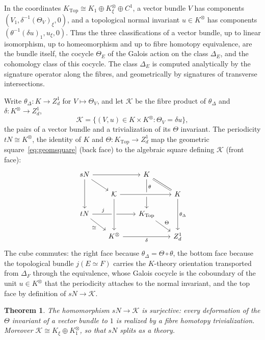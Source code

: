 \documentclass[11pt]{amsart}
\theoremstyle{plain}
\newtheorem{theorem}{Theorem}[section]
\theoremstyle{definition}
\numberwithin{equation}{section}
\newcommand{\Ktop}{K_{\mathrm{Top}}}
\begin{document}
In the coordinates $\Ktop\cong K_1\oplus K^\otimes_\xi\oplus C^1$, a vector bundle $V$ has components $(V_1,\delta^{-1}(\Theta_V)_\xi,0)$, and a topological normal invariant $u\in K^\otimes$ has components $(\theta^{-1}(\delta u)_1,u_\xi,0)$.
Thus the three classifications of a vector bundle, up to linear isomorphism, up to homeomorphism and up to fibre homotopy equivalence, are the bundle itself, the cocycle $\Theta_E$ of the Galois action on the class $\Delta_E$, and the cohomology class of this cocycle.
The class $\Delta_E$ is computed analytically by the signature operator along the fibres, and geometrically by signatures of transverse intersections.

Write $\theta_\Delta\colon K\to Z^1_d$ for $V\mapsto\Theta_V$, and let $\mathcal K$ be the fibre product of $\theta_\Delta$ and $\delta\colon K^\otimes\to Z^1_d$,
\[
\mathcal K=\{(V,u)\in K\times K^\otimes:\Theta_V=\delta u\},
\]
the pairs of a vector bundle and a trivialization of its $\Theta$ invariant.
The periodicity $tN\cong K^\otimes$, the identity of $K$ and $\Theta\colon\Ktop\to Z^1_d$ map the geometric square~\eqref{eq:geomsquare} (back face) to the algebraic square defining $\mathcal K$ (front face):
\begin{equation}\label{eq:cube}
\begin{tikzcd}[row sep=scriptsize,column sep=scriptsize]
sN\arrow[rr]\arrow[dd]\arrow[rd] & & K\arrow[dd,"\theta" near start]\arrow[rd,equal] & \\
& \mathcal K\arrow[rr,crossing over] & & K\arrow[dd,"\theta_\Delta"]\\
tN\arrow[rr,"j" near start]\arrow[rd,"\cong"'] & & \Ktop\arrow[rd,"\Theta"] & \\
& K^\otimes\arrow[rr,"\delta"']\arrow[from=uu,crossing over] & & Z^1_d
\end{tikzcd}
\end{equation}
The cube commutes: the right face because $\theta_\Delta=\Theta\circ\theta$, the bottom face because the topological bundle $j(E\simeq F)$ carries the $K$-theory orientation transported from $\Delta_F$ through the equivalence, whose Galois cocycle is the coboundary of the unit $u\in K^\otimes$ that the periodicity attaches to the normal invariant, and the top face by definition of $sN\to\mathcal K$.

\begin{theorem}\label{thm:sN}
The homomorphism $sN\to\mathcal K$ is surjective: every deformation of the $\Theta$ invariant of a vector bundle to $1$ is realized by a fibre homotopy trivialization.
Moreover $\mathcal K\cong K_\xi\oplus K^\otimes_1$, so that $sN$ splits as a theory.
\end{theorem}
\end{document}
